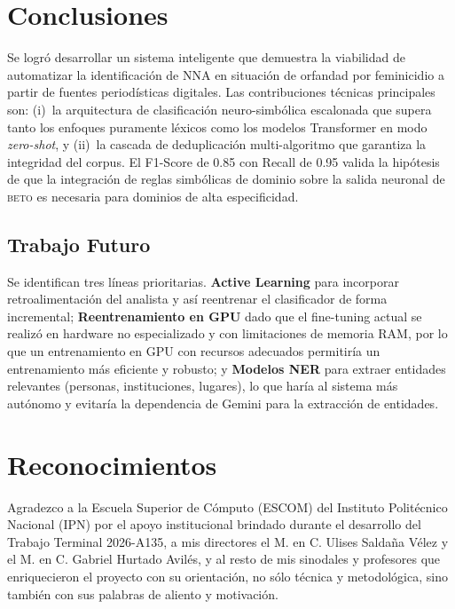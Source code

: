 \documentclass[conference]{IEEEtran}
\newcommand{\BETO}{\textsc{beto}}
\newcommand{\NNA}{NNA}
\begin{document}
\section{Conclusiones}

Se logró desarrollar un sistema inteligente que demuestra
la viabilidad de automatizar la identificación de \NNA{} en situación de
orfandad por feminicidio a partir de fuentes periodísticas digitales. Las
contribuciones técnicas principales son: (i)~la arquitectura de
clasificación neuro-simbólica escalonada que supera tanto los enfoques
puramente léxicos como los modelos Transformer en modo \textit{zero-shot},
y (ii)~la cascada de deduplicación multi-algoritmo que garantiza la
integridad del corpus. El F1-Score de 0.85 con Recall de 0.95 valida la
hipótesis de que la integración de reglas simbólicas de dominio sobre la
salida neuronal de \BETO{} es necesaria para dominios de alta especificidad.

\subsection{Trabajo Futuro}

Se identifican tres líneas prioritarias. \textbf{Active Learning} para incorporar retroalimentación del analista
y así reentrenar el clasificador de forma incremental; \textbf{Reentrenamiento en GPU} dado que el fine-tuning
actual se realizó en hardware no especializado y con limitaciones de memoria RAM,
por lo que un entrenamiento en GPU con recursos adecuados permitiría un entrenamiento
más eficiente y robusto; y \textbf{Modelos NER} para extraer entidades relevantes (personas,
instituciones, lugares), lo que haría al sistema más autónomo y evitaría la dependencia
de Gemini para la extracción de entidades.

\section*{Reconocimientos}

Agradezco a la Escuela Superior de Cómputo (ESCOM) del
Instituto Politécnico Nacional (IPN) por el apoyo institucional brindado
durante el desarrollo del Trabajo Terminal 2026-A135, a mis directores el M. en C.
Ulises Saldaña Vélez y el M. en C. Gabriel Hurtado Avilés, y al resto
de mis sinodales y profesores que enriquecieron el proyecto con su orientación,
no sólo técnica y metodológica, sino también con sus palabras de
aliento y motivación.
\end{document}
